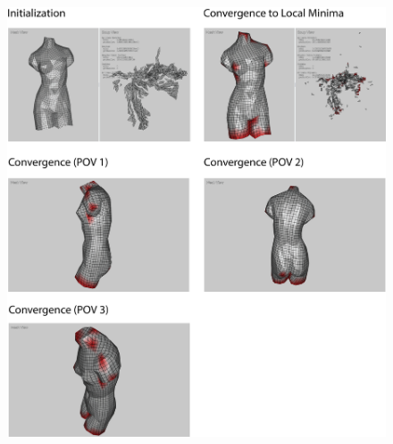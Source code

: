 \documentclass{article}
\begin{document}
\newpage
{}
\begin{figure}[ht]
\centering
\includegraphics[width=14cm]{venus.png}
\end{figure}


\end{document}
